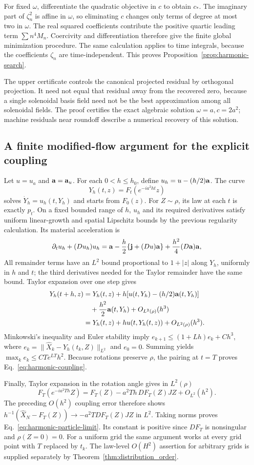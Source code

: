 For fixed $\omega$, differentiate the quadratic objective in $c$ to
obtain $c_*$. The imaginary part of $\zeta_n^2$ is affine in $\omega$,
so eliminating $c$ changes only terms of degree at most two in
$\omega$. The real squared coefficients contribute the positive
quartic leading term $\sum n^4M_n$. Coercivity and differentiation
therefore give the finite global minimization procedure. The same
calculation applies to time integrals, because the coefficients
$\zeta_n$ are time-independent. This proves
Proposition~\ref{prop:harmonic-search}.

The upper certificate controls the canonical projected residual by
orthogonal projection. It need not equal that residual away from the
recovered zero, because a single solenoidal basis field need not be the
best approximation among all solenoidal fields. The proof certifies
the exact algebraic solution $\omega=a,c=2a^2$; machine residuals near
roundoff describe a numerical recovery of this solution.

\subsection{A finite modified-flow argument for the explicit coupling}

Let $u=u_a$ and $\mathbf a=\mathbf a_u$. For each $0<h\le h_0$, define
$u_h=u-(h/2)\mathbf a$. The curve
\[
 Y_h(t,z)=F_t(e^{-ia^2ht}z)
\]
solves $\dot Y_h=u_h(t,Y_h)$ and starts from $F_0(z)$.
For $Z\sim\rho$, its law at each $t$ is exactly $p_t$.
On a fixed bounded range of $h$, $u_h$ and its required derivatives
satisfy uniform linear-growth and spatial Lipschitz bounds by the
previous regularity calculation. Its material acceleration is
\[
 \partial_tu_h+(D u_h)u_h
 =\mathbf a-\frac h2\{\mathbf j+(Du)\mathbf a\}
       +\frac{h^2}4(D\mathbf a)\mathbf a,
\]
All remainder terms have an $L^2$ bound proportional to
$1+|z|$ along $Y_h$, uniformly in $h$ and $t$; the third derivatives
needed for the Taylor remainder have the same bound. Taylor expansion
over one step gives
\begin{align*}
 Y_h(t+h,z)
 &=Y_h(t,z)+h[u(t,Y_h)-(h/2)\mathbf a(t,Y_h)]\\
 &\quad+\frac{h^2}2\mathbf a(t,Y_h)
       +O_{L^2(\rho)}(h^3)\\
 &=Y_h(t,z)+h u(t,Y_h(t,z))+O_{L^2(\rho)}(h^3).
\end{align*}
Minkowski's inequality and Euler stability imply
$e_{k+1}\le(1+Lh)e_k+Ch^3$, where
$e_k=\|\widehat X_k-Y_h(t_k,Z)\|_{L^2}$ and $e_0=0$.
Summing yields $\max_ke_k\le CT e^{LT}h^2$. Because rotations preserve
$\rho$, the pairing at $t=T$ proves
Eq.~\eqref{eq:harmonic-coupling}.

Finally, Taylor expansion in the rotation angle gives in $L^2(\rho)$
\[
 F_T(e^{-ia^2Th}Z)
 =F_T(Z)-a^2Th\,DF_T(Z)JZ+O_{L^2}(h^2).
\]
The preceding $O(h^2)$ coupling error therefore shows
$h^{-1}(\widehat X_N-F_T(Z))\to-a^2TDF_T(Z)JZ$ in $L^2$.
Taking norms proves Eq.~\eqref{eq:harmonic-particle-limit}. Its constant
is positive since $DF_T$ is nonsingular and $\rho(Z=0)=0$.
For a uniform grid the same argument works at every grid point with
$T$ replaced by $t_k$. The law-level $O(H^2)$ assertion for arbitrary
grids is supplied separately by Theorem~\ref{thm:distribution_order}.
